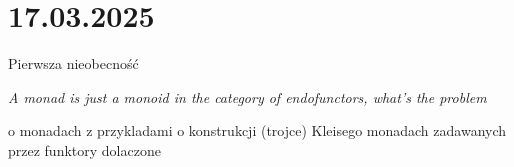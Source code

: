 \section{17.03.2025}{Pierwsza nieobecność}

\begin{adjustwidth}{90pt}{0pt}
\begin{flushright}\slshape
  A monad is just a monoid in the category of endofunctors, what's the problem
\end{flushright}
\end{adjustwidth}

o monadach z przykladami
o konstrukcji (trojce) Kleisego
monadach zadawanych przez funktory dolaczone





